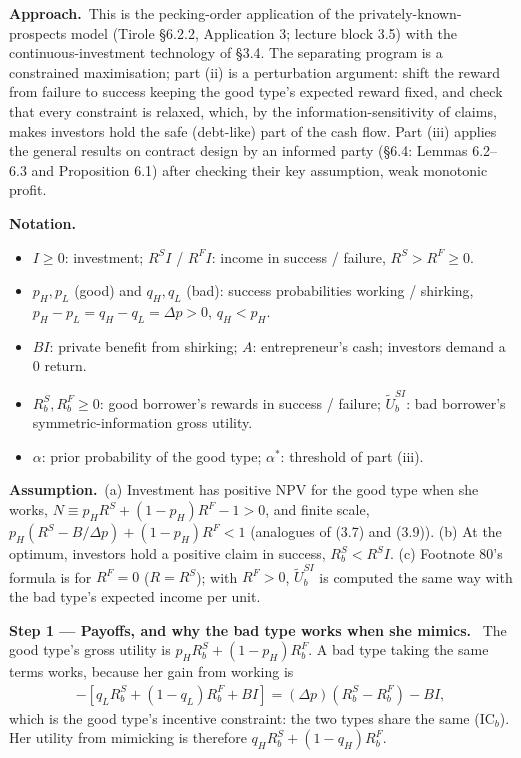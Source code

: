 \documentclass[11pt,a4paper]{article}
\newcommand{\notation}{\par\noindent\textbf{Notation.}}
\newcommand{\step}[2]{\par\medskip\noindent\textbf{Step #1 --- #2.}~}
\newcommand{\assume}{\par\smallskip\noindent\textbf{Assumption.}~}
\newcommand{\approach}{\par\smallskip\noindent\textbf{Approach.}~}
\begin{document}
\approach This is the pecking-order application of the privately-known-prospects model (Tirole \S6.2.2, Application 3; lecture block 3.5) with the continuous-investment technology of \S3.4. The separating program is a constrained maximisation; part (ii) is a perturbation argument: shift the reward from failure to success keeping the good type's expected reward fixed, and check that every constraint is relaxed, which, by the information-sensitivity of claims, makes investors hold the safe (debt-like) part of the cash flow. Part (iii) applies the general results on contract design by an informed party (\S6.4: Lemmas 6.2--6.3 and Proposition 6.1) after checking their key assumption, weak monotonic profit.

\notation
\begin{itemize}
  \item $I\ge0$: investment; $R^SI$ / $R^FI$: income in success / failure, $R^S>R^F\ge0$.
  \item $p_H,p_L$ (good) and $q_H,q_L$ (bad): success probabilities working / shirking, $p_H-p_L=q_H-q_L=\Delta p>0$, $q_H<p_H$.
  \item $BI$: private benefit from shirking; $A$: entrepreneur's cash; investors demand a 0 return.
  \item $R_b^S,R_b^F\ge0$: good borrower's rewards in success / failure; $\tilde U_b^{SI}$: bad borrower's symmetric-information gross utility.
  \item $\alpha$: prior probability of the good type; $\alpha^*$: threshold of part (iii).
\end{itemize}

\assume (a) Investment has positive NPV for the good type when she works,
$N\equiv p_HR^S+(1-p_H)R^F-1>0$, and finite scale, $p_H(R^S-B/\Delta p)+(1-p_H)R^F<1$ (analogues of
(3.7) and (3.9)). (b) At the optimum, investors hold a positive claim in success, $R_b^S<R^SI$. (c) Footnote 80's
formula is for $R^F=0$ ($R=R^S$); with $R^F>0$, $\tilde U_b^{SI}$ is computed the same way with the
bad type's expected income per unit.

\step{1}{Payoffs, and why the bad type works when she mimics} The good type's gross utility is
$p_HR_b^S+(1-p_H)R_b^F$. A bad type taking the same terms works, because her gain from working is
\begin{align}
  [q_HR_b^S+(1-q_H)R_b^F]-[q_LR_b^S+(1-q_L)R_b^F+BI]
  = (\Delta p)(R_b^S-R_b^F)-BI, \nonumber
\end{align}
which is the good type's incentive constraint: the two types share the same (IC$_b$). Her utility from
mimicking is therefore $q_HR_b^S+(1-q_H)R_b^F$.
\end{document}
